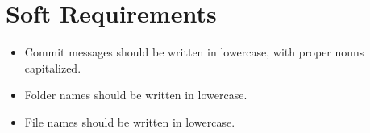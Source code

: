 \chapter{Soft Requirements}

\begin{itemize}
    \item Commit messages should be written in lowercase, with proper nouns capitalized.
    \item Folder names should be written in lowercase.
    \item File names should be written in lowercase.
\end{itemize}
